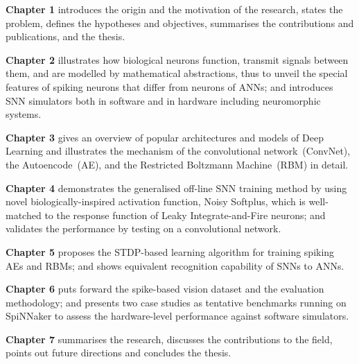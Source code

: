 \textbf{Chapter 1} introduces the origin and the motivation of the research, states the problem, defines the hypotheses and objectives, summarises the contributions and publications, and \protect{} \protect{} the thesis. 

\textbf{Chapter 2} illustrates how biological neurons function, transmit signals between them, and are modelled by mathematical abstractions, thus to unveil the special features of spiking neurons that differ from \protect{} neurons of ANNs; and introduces SNN simulators both in software and in hardware including neuromorphic systems.

\textbf{Chapter 3} gives an overview of popular architectures and models of Deep Learning and illustrates the mechanism of the convolutional network~(ConvNet), the Autoencode~(AE), and the Restricted Boltzmann Machine~(RBM) in detail.

\textbf{Chapter 4} demonstrates the generalised off-line SNN training method by using \protect{} novel biologically-inspired activation function, Noisy Softplus, which is well-matched to the response function of Leaky Integrate-and-Fire neurons; and validates the performance by testing on a convolutional network.

\textbf{Chapter 5} proposes the STDP-based learning algorithm for training spiking AEs and RBMs; and shows equivalent recognition capability of SNNs \protect{} \protect{} to ANNs.

\textbf{Chapter 6} puts forward the spike-based vision dataset and the evaluation methodology; and presents two case studies as tentative benchmarks running on SpiNNaker to assess the hardware-level performance against software simulators.

\textbf{Chapter 7} summarises the research, discusses the contributions to the field, points out future directions and concludes the thesis.



